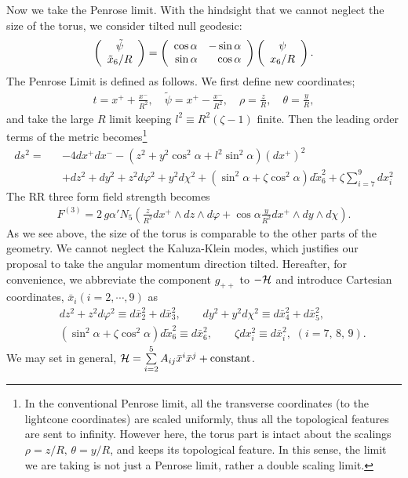 \documentclass[a4paper,12pt]{article}
\begin{document}
Now we take the Penrose limit.
With the hindsight that we cannot neglect the size of the torus, we consider tilted null geodesic:
\begin{eqnarray}
\left(
\begin{array}{c}
\tilde{\psi}\cr
\tilde{x}_6/R
\end{array}
\right)=\left(\begin{array}{rr}
\cos{\alpha}&-\sin{\alpha}\cr \sin{\alpha}&\cos{\alpha}
\end{array}
\right)
\left(
\begin{array}{c}
\psi\cr x_6/R
\end{array}
\right).
\end{eqnarray}
The Penrose Limit is defined as follows. We first define new coordinates;
\begin{eqnarray}\label{pplimit}
t=x^++\frac{x^-}{R^2},\quad \tilde{\psi}=x^+-\frac{x^-}{R^2},\quad \rho=\frac{z}{R},\quad \theta=\frac{y}{R},
\end{eqnarray}
and take the large $R$ limit keeping $l^2\equiv R^2(\zeta-1)$ finite. Then the leading order terms of the metric becomes\footnote{In the conventional Penrose limit, all the transverse coordinates (to the lightcone coordinates) are scaled uniformly, thus all the topological features are sent to infinity. However here, the torus part is intact about the scalings $\rho=z/R,\, \theta=y/R$, and keeps its topological feature. In this sense, the limit we are taking is not just a Penrose limit, rather a double scaling limit.}
\begin{eqnarray}\label{metric}
ds^2=&&-4dx^+dx^--\left(z^2+y^2\cos^2{\alpha}+l^2\sin^2{\alpha}\right)(dx^+)^2\nonumber\\
&&+dz^2+dy^2+z^2d\varphi^2+y^2d\chi^2+\left(\sin^2{\alpha}+\zeta\cos^2{\alpha}\right)d\tilde{x}_6^2+\zeta\sum\limits_{i=7}^9 dx_i^2
\end{eqnarray}
The RR three form field strength becomes
\begin{eqnarray}\label{F}
F^{(3)}=2\,g\alpha'N_5\left(\frac{z}{R^2}dx^+\wedge dz\wedge d\varphi +\cos{\alpha}\frac{y}{R^2}dx^+\wedge dy\wedge d\chi\right).
\end{eqnarray}
As we see above, the size of the torus is comparable to the other parts of the geometry. We cannot neglect the Kaluza-Klein modes, which justifies our proposal to take the angular momentum direction tilted.
Hereafter, for convenience, we abbreviate the component $g_{++}$ to $-{\cal H}$ and introduce Cartesian coordinates, $\bar{x}_i (i=2,\cdots,9)$ as 
\begin{eqnarray}
&&dz^2+z^2d\varphi^2\equiv d\bar{x}_2^2+d\bar{x}_3^2,\qquad
dy^2+y^2d\chi^2\equiv d\bar{x}_4^2+d\bar{x}_5^2, \nonumber\\
&&\left(\sin^2{\alpha}+\zeta\cos^2{\alpha}\right)d\tilde{x}_6^2\equiv d\bar{x}_6^2,\qquad
\zeta dx_i^2\equiv d\bar{x}_i^2,\,\,(i=7,\,8,\,9). 
\end{eqnarray}
We may set in general, ${\cal H}=\sum\limits^5_{i=2}A_{ij}\bar{x}^i\bar{x}^j+\mbox{constant}$.
\end{document}
